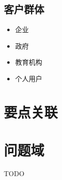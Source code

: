 \documentclass[a4paper,12pt]{article}
\begin{document}
\subsection{客户群体}
\begin{itemize}[label=--, left=0pt]
    \item 企业
    \item 政府
    \item 教育机构
    \item 个人用户
\end{itemize}
\tableofcontents
\section{要点关联}

\tableofcontents
\section{问题域}
TODO
\end{document}
